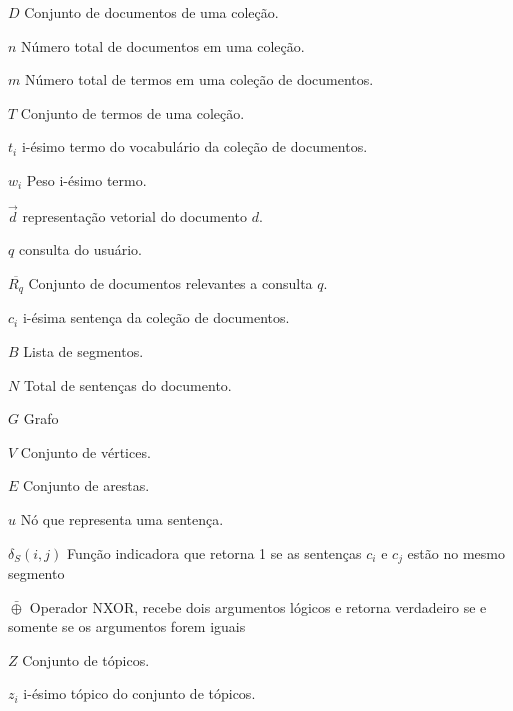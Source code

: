 

\begin{simbolos}
\item[$ D $] Conjunto de documentos de uma coleção. 
  \item[$ n $] Número total de documentos em uma coleção.
  \item[$ m $] Número total de termos em uma coleção de documentos.
  \item[$ T $] Conjunto de termos de uma coleção. 
  \item[$ t_i $] i-ésimo termo do vocabulário da coleção de documentos. 
  \item[$ w_i $] Peso i-ésimo termo.
  \item[$ \vec{d} $] representação vetorial do documento $d$.
  \item[$ q $] consulta do usuário.
  \item[$ \overline{R_q} $] Conjunto de documentos relevantes a consulta $q$.
  \item[$ c_i $] i-ésima sentença da coleção de documentos. 
  \item[$ B $] Lista de segmentos. 
  \item[$ N $] Total de sentenças do documento.
  \item[$ G $] Grafo 
  \item[$ V $] Conjunto de vértices. 
  \item[$ E $] Conjunto de arestas. 
  \item[$ u $] Nó que representa uma sentença. 
  \item[$ \delta_S(i,j) $] Função indicadora que retorna 1 se as sentenças $c_i$ e $c_j$ estão no mesmo segmento
  \item[$ \bar{\oplus} $] Operador NXOR, recebe dois argumentos lógicos e retorna verdadeiro se e somente se os argumentos forem iguais %
  \item[$ Z $] Conjunto de tópicos. 
  \item[$ z_i $] i-ésimo tópico do conjunto de tópicos. 


\end{simbolos}
